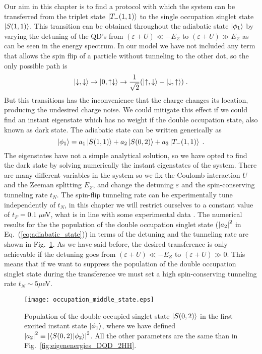 Our aim in this chapter is to find a protocol with which the system can be transferred from the triplet state $\ket{T_-(1,1)}$ to the single occupation singlet state $\ket{S(1,1)}$. This transition can be obtained  throughout the adiabatic state $\ket{\phi_1}$ by varying the detuning of the QD's from $(\varepsilon+U)\ll-E_Z$ to $(\varepsilon+U)\gg E_Z$ as can be seen in the energy spectrum. In our model we have not included any term that allows the spin flip of a particle without tunneling to the other dot, so the only possible path is
\begin{equation}
	\ket{\downarrow,\downarrow}\rightarrow\ket{0,\uparrow\downarrow}\rightarrow\frac{1}{\sqrt{2}}(\ket{\uparrow,\downarrow}-\ket{\downarrow,\uparrow})\; .
\end{equation}
But this transitions has the inconvenience that the charge changes its location, producing the undesired charge noise. We could mitigate this effect if we could find an instant eigenstate which has no weight if the double occupation state, also known as dark state. The adiabatic state can be written generically as
\begin{equation}
	\ket{\phi_1}=a_1\ket{S(1,1)}+a_2\ket{S(0,2)}+a_3\ket{T_-(1,1)}\; .
	\label{eq:adiabatic_state}
\end{equation}
The eigenstates have not a simple analytical solution, so we have opted to find the dark state by solving numerically the instant eigenstates of the system. There are many different variables in the system so we fix the Coulomb interaction $U$ and the Zeeman splitting $E_Z$, and change the detuning $\varepsilon$ and the spin-conserving tunneling rate $t_N$. The spin-flip tunneling rate can be experimentally tune independently of $t_N$, in this chapter we will restrict ourselves to a constant value of $t_F=0.1\; \mu$eV, what is in line with some experimental data \cite{Bogan2018}. The numerical results for the the population of the double occupation singlet state ($\abs{a_2}^2$ in Eq.~(\ref{eq:adiabatic_state})) in terms of the detuning and the tunneling rate are shown in Fig.~\ref{fig:occupation_middle_state}. As we have said before, the desired transference is only achievable if the detuning goes from $(\varepsilon+U)\ll -E_Z$ to $(\varepsilon+U)\gg 0$. This means that if we want to suppress the population of the double occupation singlet state during the transference we must set a high spin-conserving tunneling rate $t_N\sim 5\mu$eV.
\begin{figure}[!htb]
	\centering
	\texttt{[image: occupation\_middle\_state.eps]}
	\caption{Population of the double occupied singlet state $\ket{S(0,2)}$ in the first excited instant state $\ket{\phi_1}$, where we have defined $\abs{a_2}^2\equiv \abs{\braket{S(0,2)}{\phi_2}}^2$. All the other parameters are the same than in Fig.~\ref{fig:eigenenergies_DQD_2HH}.}
	\label{fig:occupation_middle_state}
\end{figure}

